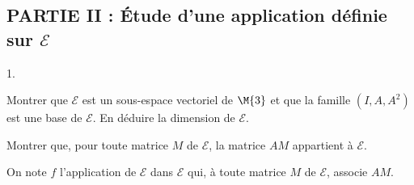 \subsection*{PARTIE II : Étude d'une application définie sur 
$\mathcal{E}$}
\begin{noliste}{1.}
\setlength{\itemsep}{4mm}
\setcounter{enumi}{4}
\item Montrer que $\mathcal{E}$ est un sous-espace vectoriel de 
$\M{3}$ et que la famille $(I,A,A^2)$ est une base 
de $\mathcal{E}$. En déduire la dimension de $\mathcal{E}$.




\item Montrer que, pour toute matrice $M$ de $\mathcal{E}$, la matrice 
$AM$ appartient à $\mathcal{E}$.


\end{noliste}

\noindent
On note $f$ l'application de $\mathcal{E}$ dans $\mathcal{E}$ qui, à 
toute matrice $M$ de $\mathcal{E}$, associe $AM$.

